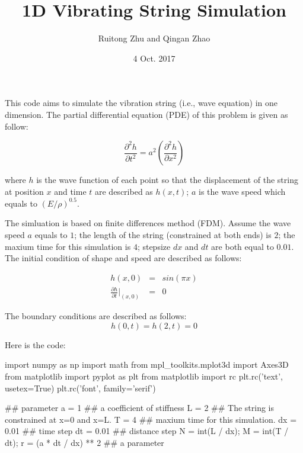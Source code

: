 \documentclass[11pt]{article}
\title{1D Vibrating String Simulation}
\date{4 Oct. 2017}
\author{Ruitong Zhu and Qingan Zhao}
\begin{document}
\maketitle
\newcommand{\ud}{\mathrm d} %
\renewcommand\theequation{\arabic{equation}}
\renewcommand{\figurename}{Fig.}

This code aims to simulate the vibration string (i.e., wave equation) in one dimension. The partial differential equation (PDE) of this problem is given as follow:

\begin{equation}
\frac{\partial^2 h}{\partial t^2}=a^2\left(\frac{\partial^2 h}{\partial x^2}\right)
\end{equation}

where $h$ is the wave function of each point so that the displacement of the string at position $x$ and time $t$ are described as $h(x,t)$; $a$ is the wave speed which equals to $(E/\rho)^{0.5}$.

The simluation is based on finite differences method (FDM). Assume the wave speed $a$ equals to $1$; the length of the string (constrained at both ends) is $2$; the maxium time for this simulation is $4$; stepsize $dx$ and $dt$ are both equal to $0.01$. The initial condition of shape and speed are described as follows:

\begin{eqnarray}
h(x,0)&=&sin(\pi x)\\
\frac{\partial h}{\partial t}\bigg |_{(x,0)}&=&0
\end{eqnarray}

The boundary conditions are described as follows:
\begin{equation}
h(0,t)=h(2,t)=0
\end{equation}

Here is the code:
\begin{python}
	import numpy as np
	import math
	from mpl_toolkits.mplot3d import Axes3D
	from matplotlib import pyplot as plt
	from matplotlib import rc
	plt.rc('text', usetex=True)
	plt.rc('font', family='serif')

	## parameter
	a = 1  ## a coefficient of stiffness
	L = 2  ## The string is constrained at x=0 and x=L.
	T = 4  ## maxium time for this simulation.
	dx = 0.01  ## time step
	dt = 0.01  ## distance step
	N = int(L / dx);
	M = int(T / dt);
	r = (a * dt / dx) ** 2  ## a parameter
\end{python}
	
\end{document}

